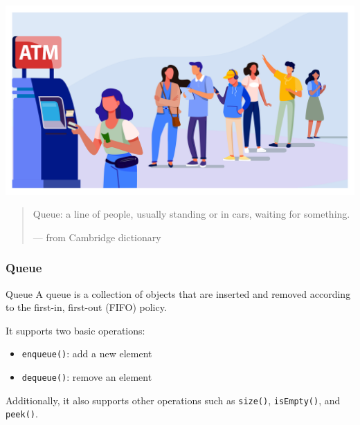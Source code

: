 \documentclass[aspectratio=169, 14pt]{beamer}
\begin{document}
\begin{frame}

   \begin{center}
    \includegraphics[height=.5\paperheight]{week4/atm}
   \end{center} 
   \begin{quote}
    Queue: a line of people, usually standing or in cars, waiting for something.
    \begin{flushright}
        --- from Cambridge dictionary
    \end{flushright}
\end{quote}
\end{frame}

\begin{frame}
    \frametitle{Queue}

    \begin{exampleblock}{Queue}
        A queue is a collection of objects that are inserted and removed according to the 
        \alert{first-in, first-out (FIFO)} policy.        
    \end{exampleblock}
    \pause
    It supports two basic operations:
    \begin{itemize}
        \item \texttt{enqueue()}: add a new element
        \item \texttt{dequeue()}: remove an element
    \end{itemize}
    Additionally, it also supports other operations such as \texttt{size()}, \texttt{isEmpty()}, and \texttt{peek()}.
\end{frame}
\end{document}
